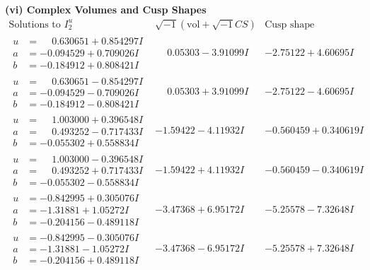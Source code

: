 \documentclass[1p]{elsarticle_modified}
\theoremstyle{definition}
\newcommand{\I}{\sqrt{-1}}
\begin{document}
\newpage\flushleft \textbf{(vi) Complex Volumes and Cusp Shapes}
$$\begin{array}{c|c|c}  
\text{Solutions to }I^u_{2}& \I (\text{vol} + \sqrt{-1}CS) & \text{Cusp shape}\\
 \hline 
\begin{aligned}
u &= \phantom{-}0.630651 + 0.854297 I \\
a &= -0.094529 + 0.709026 I \\
b &= -0.184912 + 0.808421 I\end{aligned}
 & \phantom{-}0.05303 - 3.91099 I & -2.75122 + 4.60695 I \\ \hline\begin{aligned}
u &= \phantom{-}0.630651 - 0.854297 I \\
a &= -0.094529 - 0.709026 I \\
b &= -0.184912 - 0.808421 I\end{aligned}
 & \phantom{-}0.05303 + 3.91099 I & -2.75122 - 4.60695 I \\ \hline\begin{aligned}
u &= \phantom{-}1.003000 + 0.396548 I \\
a &= \phantom{-}0.493252 - 0.717433 I \\
b &= -0.055302 + 0.558834 I\end{aligned}
 & -1.59422 - 4.11932 I & -0.560459 + 0.340619 I \\ \hline\begin{aligned}
u &= \phantom{-}1.003000 - 0.396548 I \\
a &= \phantom{-}0.493252 + 0.717433 I \\
b &= -0.055302 - 0.558834 I\end{aligned}
 & -1.59422 + 4.11932 I & -0.560459 - 0.340619 I \\ \hline\begin{aligned}
u &= -0.842995 + 0.305076 I \\
a &= -1.31881 + 1.05272 I \\
b &= -0.204156 - 0.489118 I\end{aligned}
 & -3.47368 + 6.95172 I & -5.25578 - 7.32648 I \\ \hline\begin{aligned}
u &= -0.842995 - 0.305076 I \\
a &= -1.31881 - 1.05272 I \\
b &= -0.204156 + 0.489118 I\end{aligned}
 & -3.47368 - 6.95172 I & -5.25578 + 7.32648 I \\ \hline\begin{aligned}

\end{aligned}
\end{array}$$
\end{document}
